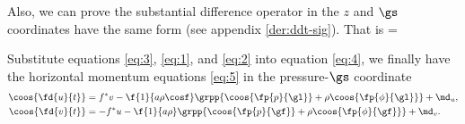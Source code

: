 Also, we can prove the substantial difference operator in the $z$ and $\gs$
coordinates have the same form (see appendix \ref{der:ddt-sig}). That is
\beeq \label{eq:3}
 = 
\eneq

Substitute equations \ref{eq:3}, \ref{eq:1}, and \ref{eq:2} into equation
\ref{eq:4}, we finally have the horizontal momentum equations \ref{eq:5} in the
pressure-$\gs$ coordinate
\bese
\begin{align}
  \coos{ \fd{u}{t} } &= f^{*}v -\f{1}{a\rho\cosf} 
  \grpp{ \coos{ \fp{p}{\gl} } + \rho \coos{ \fp{\phi}{\gl} }  } +\md_u, \\
  \coos{ \fd{v}{t} } &=-f^{*}u-\f{1}{a\rho}
  \grpp{ \coos{ \fp{p}{\gf} } + \rho \coos{ \fp{\phi}{\gf} }  } +\md_v.
\end{align}
\ense
